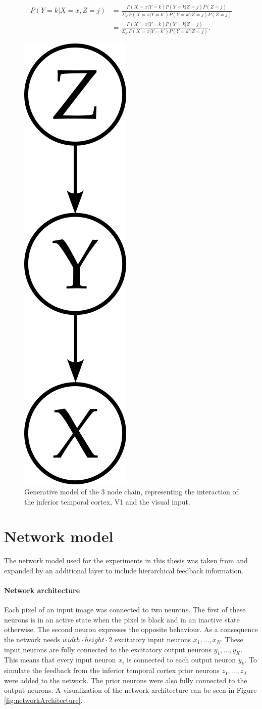 \begin{equation}
\label{eqn:pYvorausgesetztXUndZ}
\begin{split}
P(Y = k|X = x, Z = j) &= \frac{P(X=x|Y=k)P(Y = k|Z = j)P(Z = j)}{\Sigma_{k'}P(X=x|Y=k')P(Y=k'|Z=j)P(Z=j)}\\
&= \frac{P(X=x|Y=k)P(Y = k|Z = j)}{\Sigma_{k'}P(X=x|Y=k')P(Y=k'|Z=j)}.
\end{split}
\end{equation}

\begin{figure}
  \centering
  \label{fig:generativeModel}
  \includegraphics[width=0.075\linewidth]{figures/generativeModel.png}
  \caption{Generative model of the 3 node chain, representing the interaction of the inferior temporal cortex, V1 and the visual input.}
\end{figure}

\section{Network model}

The network model used for the experiments in this thesis was taken from \citet{nessler} and expanded by an additional layer to include hierarchical feedback information.

\paragraph{Network architecture}
Each pixel of an input image was connected to two neurons. The first of these neurons is in an active state when the pixel is black and in an inactive state otherwise. The second neuron expresses the opposite behaviour. As a consequence the network needs $width \cdot height \cdot 2$ excitatory input neurons $x_1,...,x_N$. These input neurons are fully connected to the excitatory output neurons $y_1,...,y_K$. This means that every input neuron $x_i$ is connected to each output neuron $y_k$. 
To simulate the feedback from the inferior temporal cortex prior neurons $z_1,...,z_J$ were added to the network. The prior neurons were also fully connected to the output neurons. A visualization of the network architecture can be seen in Figure \ref{fig:networkArchitecture}.

